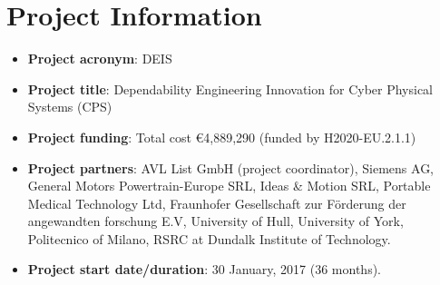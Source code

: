 \section{Project Information}
\begin{itemize}
	\item \textbf{Project acronym}: DEIS
	\item \textbf{Project title}: Dependability Engineering Innovation for Cyber Physical Systems (CPS)
	\item \textbf{Project funding}: Total cost \euro 4,889,290 (funded by H2020-EU.2.1.1)
	\item \textbf{Project partners}: AVL List GmbH (project coordinator), Siemens AG, General Motors Powertrain-Europe SRL, Ideas \& Motion SRL, Portable Medical Technology Ltd, Fraunhofer Gesellschaft zur F{\"o}rderung der angewandten forschung E.V, University of Hull, University of York, Politecnico of Milano, RSRC at Dundalk Institute of Technology.
	\item \textbf{Project start date/duration}: 30 January, 2017 (36 months).
\end{itemize}